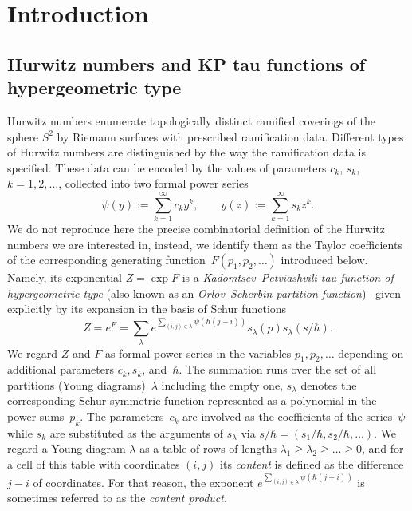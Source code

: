 \section{Introduction}

\subsection{Hurwitz numbers and KP tau functions of hypergeometric type}

Hurwitz numbers enumerate topologically distinct ramified coverings of the sphere $S^2$ by \hbox{Riemann} surfaces with prescribed ramification data. Different types of Hurwitz numbers are distinguished by the way the ramification data is specified. These data can be encoded by the values of parameters $c_k$, $s_k$, $k=1,2,\dots$, collected into two formal power series\vspace*{-5pt}
\begin{equation}\label{eq:psiY}
\psi(y):=\sum_{k=1}^\infty c_k y^k,\qquad
y(z):=\sum_{k=1}^\infty s_k z^k.
\end{equation}
We do not reproduce here the precise combinatorial definition of the Hurwitz numbers we are interested in, instead, we identify them as the Taylor coefficients of the corresponding generating function~$F(p_1,p_2,\dots)$ introduced below. Namely, its exponential $Z=\exp F$ is a \emph{Kadomtsev--Petviashvili tau function of hypergeometric type} (also known as an \emph{Orlov--Scherbin partition function})~\cite{Kharchev,OrlovScherbin,OrlovScherbin-2} given explicitly by its expansion in the basis of Schur functions
\begin{equation}\label{eq:OS}
Z=e^{F}=\sum_\lambda e^{\sum_{(i,j)\in\lambda}\psi(\hbar(j-i))}s_\lambda(p)s_\lambda(s/\hbar).
\end{equation}
We regard $Z$ and $F$ as formal power series in the variables $p_1,p_2,\dots$ depending on additional parameters $c_k, s_k$, and~$\hbar$.
The summation runs over the set of all partitions (Young diagrams)~$\lambda$ including the empty one, $s_\lambda$ denotes the corresponding Schur symmetric function represented as a polynomial in the power sums~$p_k$. The parameters~$c_k$ are involved as the coefficients of the series~$\psi$ while $s_k$ are substituted as the arguments of $s_\lambda$ via $s/\hbar=(s_1/\hbar,s_2/\hbar,\dots)$. We regard a Young diagram $\lambda$ as a table of rows of lengths $\lambda_1\ge\lambda_2\ge\dots\ge0$, and for a cell of this table with coordinates $(i,j)$ its \emph{content} is defined as the difference $j-i$ of coordinates. For that reason, the exponent $e^{\sum_{(i,j)\in\lambda}\psi(\hbar(j-i))}$ is sometimes referred to as the \emph{content product}.

